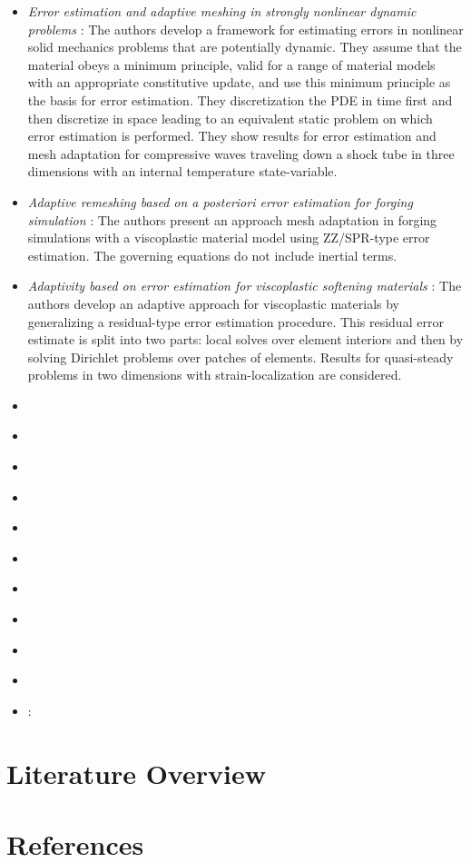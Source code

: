 \documentclass{article}
\begin{document}
\begin{itemize}
\item
\emph{Error estimation and adaptive meshing in strongly nonlinear dynamic
problems} \cite{radovitzky1999error}: The authors develop a framework for
estimating errors in nonlinear solid mechanics problems that are potentially
dynamic. They assume that the material obeys a minimum principle, valid
for a range of material models with an appropriate constitutive update,
and use this minimum principle as the basis for error estimation. They
discretization the PDE in time first and then discretize in space leading
to an equivalent static problem on which error estimation is performed.
They show results for error estimation and mesh adaptation for compressive
waves traveling down a shock tube in three dimensions with an internal
temperature state-variable.
\item
\emph{Adaptive remeshing based on a posteriori error estimation for forging
simulation} \cite{boussetta2006adaptive}: The authors present an approach
mesh adaptation in forging simulations with a viscoplastic material model
using ZZ/SPR-type error estimation. The governing equations do not include
inertial terms.
\item
\emph{Adaptivity based on error estimation for viscoplastic softening
materials}  \cite{diez2000adaptivity}: The authors develop an adaptive
approach for viscoplastic materials by generalizing a residual-type
error estimation procedure. This residual error estimate is split into two
parts: local solves over element interiors and then by solving Dirichlet
problems over patches of elements. Results for quasi-steady problems in
two dimensions with strain-localization are considered.
\item \cite{ladeveze2003estimation}
\item \cite{verdugo2014error}
\item \cite{biotteau2012three}
\item \cite{combe2002discretization}
\item \cite{scovazzi2016simple}
\item \cite{molinari2002three}
\item \cite{luo2009adaptive}
\item \cite{lahiri2010variationally}
\item \cite{masud2013framework}
\item \cite{radovitzky1999error}
\item \cite{rodríguez2000error}:
\end{itemize}

\section{Literature Overview}

\section{References}



\end{document}
